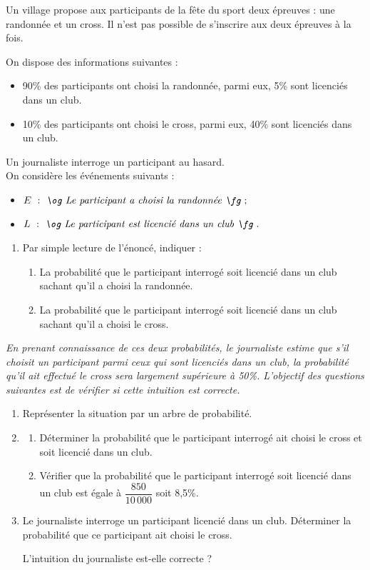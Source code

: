 Un village propose aux participants de la fête du sport deux épreuves : une randonnée et un cross. Il n'est pas possible de s'inscrire aux deux épreuves à la fois.

On dispose des informations suivantes :
\begin{itemize}
\item 90\% des participants ont choisi la randonnée, parmi eux, 5\% sont licenciés dans un club.
\item 10\% des participants ont choisi le cross, parmi eux, 40\% sont licenciés dans un club.
\end{itemize}

Un journaliste interroge un participant au hasard. \\
On considère les événements suivants :
\begin{itemize}
\item[] $E~:~\textit{\og Le participant a choisi la randonnée \fg}~;$
\item[] $L~:~\textit{\og Le participant est licencié dans un club \fg}~.$
\end{itemize}

\begin{enumerate}
\item Par simple lecture de l'énoncé, indiquer :
\begin{enumerate}
\item La probabilité que le participant interrogé soit licencié dans un club sachant qu'il a choisi la randonnée.
\item La probabilité que le participant interrogé soit licencié dans un club sachant qu'il a choisi le cross.
\end{enumerate}
\end{enumerate}

\textit{En prenant connaissance de ces deux probabilités, le journaliste estime que s'il choisit un participant parmi ceux qui sont licenciés dans un club, la probabilité qu'il ait effectué le cross sera largement supérieure à 50\%. L'objectif des questions suivantes est de vérifier si cette intuition est correcte.}

\begin{enumerate}[resume]
\item Représenter la situation par un arbre de probabilité.

\item 
\begin{enumerate}
\item Déterminer la probabilité que le participant interrogé ait choisi le cross et soit licencié dans un club.
\item Vérifier que la probabilité que le participant interrogé soit licencié dans un club est égale à $\dfrac{850}{10\,000}$ soit 8,5\%.
\end{enumerate}

\item Le journaliste interroge un participant licencié dans un club. Déterminer la probabilité que ce participant ait choisi le cross.

L'intuition du journaliste est-elle correcte ?
\end{enumerate}
